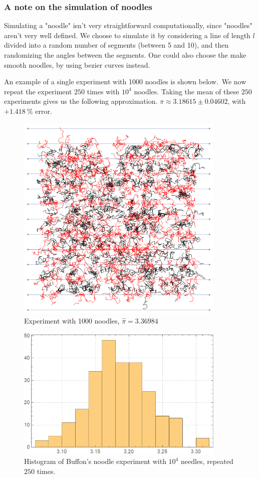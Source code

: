 \documentclass[12pt]{article}
\numberwithin{equation}{section}
\begin{document}
\subsubsection{A note on the simulation of noodles}
Simulating a "noodle" isn't very straightforward computationally, since "noodles" aren't very well defined. We choose to simulate it by considering a line of length $l$ divided into a random number of segments (between 5 and 10), and then randomizing the angles between the segments. One could also choose the make smooth noodles, by using bezier curves instead.
\par 
An example of a single experiment with 1000 noodles is shown  below.\
We now repeat the experiment $250$ times with $10^4$ noodles. Taking the mean of these $250$ experiments gives us the following approximation. $\pi \approx 3.18615 \pm 0.04602$, with $ + 1.418\ \%$ error.
\begin{figure}[!htb]
    \centering
    \includegraphics[width=10cm]{Images/noodleexample.png}
    \caption{Experiment with 1000 noodles, $\widehat{\pi}=3.36984$}
    \label{fig:noodleexample}
\end{figure}\par

\begin{figure}[!htb]
    \centering
    \includegraphics[width=10cm]{Images/repeatednoodle.png}
    \caption{Histogram of Buffon's noodle experiment with $10^4$ needles, repeated $250$ times.}
    \label{fig:repeatednoodle}
\end{figure}
\clearpage
\end{document}
